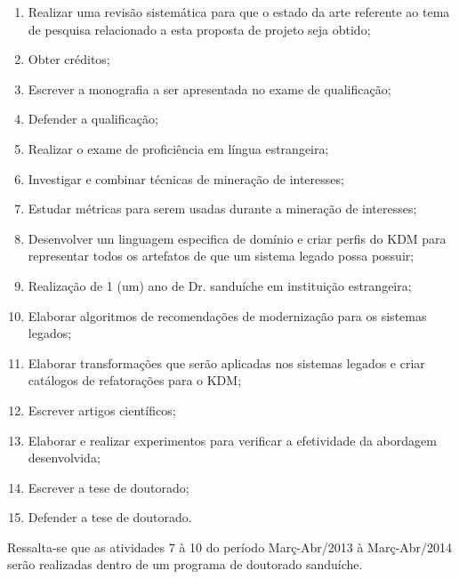 \begin{enumerate}
\item Realizar uma revisão sistemática para que o estado da arte referente ao tema de pesquisa relacionado a esta proposta de projeto seja obtido;
\item Obter créditos;
\item Escrever a monografia a ser apresentada no exame de qualificação;
\item Defender a qualificação;  
\item Realizar o exame de proficiência em língua estrangeira;
\item Investigar e combinar técnicas de mineração de interesses;
\item Estudar métricas para serem usadas durante a mineração de interesses;
\item Desenvolver um linguagem especifica de domínio e criar perfis do KDM para representar todos os artefatos de que um sistema legado possa possuir;
\item Realização de 1 (um) ano de Dr. sanduíche em instituição estrangeira;
\item Elaborar algoritmos de recomendações de modernização para os sistemas legados;
\item Elaborar transformações que serão aplicadas nos sistemas legados e criar catálogos de refatorações para o KDM;
\item Escrever artigos científicos;
\item Elaborar e realizar experimentos para verificar a efetividade da abordagem desenvolvida;
\item Escrever a tese de doutorado;
\item Defender a tese de doutorado.  
\end{enumerate}

Ressalta-se que as atividades 7 à 10 do período Març-Abr/2013 à Març-Abr/2014 serão realizadas dentro de um programa de doutorado sanduíche.